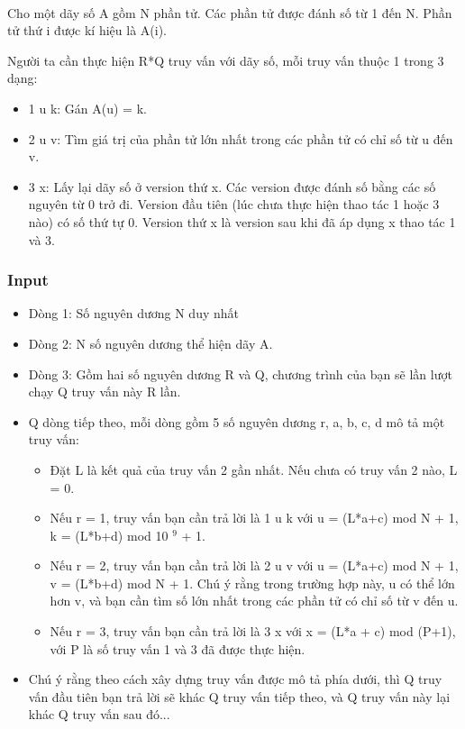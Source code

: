 

 

Cho một dãy số A gồm N phần tử. Các phần tử được đánh số từ 1 đến N. Phần tử thứ i được kí hiệu là A(i).

Người ta cần thực hiện R*Q truy vấn với dãy số, mỗi truy vấn thuộc 1 trong 3 dạng:
\begin{itemize}
	\item 1 u k: Gán A(u) = k.
	\item 2 u v: Tìm giá trị của phần tử lớn nhất trong các phần tử có chỉ số từ u đến v.
	\item 3 x: Lấy lại dãy số ở version thứ x. Các version được đánh số bằng các số nguyên từ 0 trở đi. Version đầu tiên (lúc chưa thực hiện thao tác 1 hoặc 3 nào) có số thứ tự 0. Version thứ x là version sau khi đã áp dụng x thao tác 1 và 3.
\end{itemize}

\subsubsection{Input}
\begin{itemize}
	\item Dòng 1: Số nguyên dương N duy nhất
	\item Dòng 2: N số nguyên dương thể hiện dãy A.
	\item Dòng 3: Gồm hai số nguyên dương R và Q, chương trình của bạn sẽ lần lượt chạy Q truy vấn này R lần.
	\item Q dòng tiếp theo, mỗi dòng gồm 5 số nguyên dương r, a, b, c, d mô tả một truy vấn:
\begin{itemize}
	\item Đặt L là kết quả của truy vấn 2 gần nhất. Nếu chưa có truy vấn 2 nào, L = 0.
	\item Nếu r = 1, truy vấn bạn cần trả lời là 1 u k với u = (L*a+c) mod N + 1, k = (L*b+d) mod 10 $^ 9 $ + 1.
	\item Nếu r = 2, truy vấn bạn cần trả lời là 2 u v với u = (L*a+c) mod N + 1, v = (L*b+d) mod N + 1. Chú ý rằng trong trường hợp này, u có thể lớn hơn v, và bạn cần tìm số lớn nhất trong các phần tử có chỉ số từ v đến u.
	\item Nếu r = 3, truy vấn bạn cần trả lời là 3 x với x = (L*a + c) mod (P+1), với P là số truy vấn 1 và 3 đã được thực hiện.
\end{itemize}
	\item Chú ý rằng theo cách xây dựng truy vấn được mô tả phía dưới, thì Q truy vấn đầu tiên bạn trả lời sẽ khác Q truy vấn tiếp theo, và Q truy vấn này lại khác Q truy vấn sau đó...
\begin{itemize}
\end{itemize}
\end{itemize}

